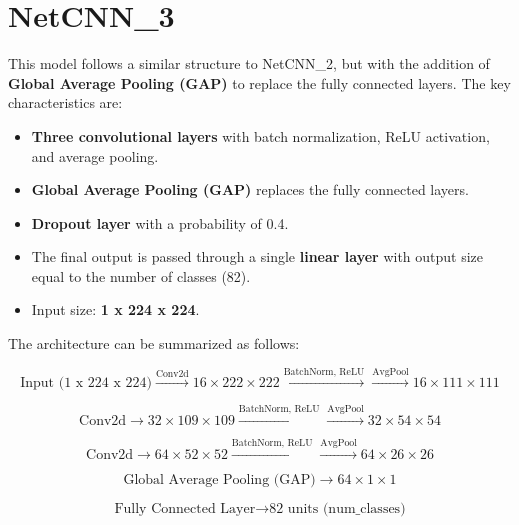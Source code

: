\documentclass[12pt]{article}
\begin{document}
\section*{NetCNN\_3}
This model follows a similar structure to NetCNN\_2, but with the addition of \textbf{Global Average Pooling (GAP)} to replace the fully connected layers. The key characteristics are:
\begin{itemize}
    \item \textbf{Three convolutional layers} with batch normalization, ReLU activation, and average pooling.
    \item \textbf{Global Average Pooling (GAP)} replaces the fully connected layers.
    \item \textbf{Dropout layer} with a probability of 0.4.
    \item The final output is passed through a single \textbf{linear layer} with output size equal to the number of classes (82).
    \item Input size: \textbf{1 x 224 x 224}.
\end{itemize}

The architecture can be summarized as follows:

\[
\text{Input (1 x 224 x 224)} \xrightarrow{\text{Conv2d}} 16 \times 222 \times 222 \xrightarrow{\text{BatchNorm, ReLU}} \xrightarrow{\text{AvgPool}} 16 \times 111 \times 111
\]

\[
\text{Conv2d} \rightarrow 32 \times 109 \times 109 \xrightarrow{\text{BatchNorm, ReLU}} \xrightarrow{\text{AvgPool}} 32 \times 54 \times 54
\]

\[
\text{Conv2d} \rightarrow 64 \times 52 \times 52 \xrightarrow{\text{BatchNorm, ReLU}} \xrightarrow{\text{AvgPool}} 64 \times 26 \times 26
\]

\[
\text{Global Average Pooling (GAP)} \rightarrow 64 \times 1 \times 1
\]

\[
\text{Fully Connected Layer} \rightarrow \text{82 units (num\_classes)}
\]
\end{document}
